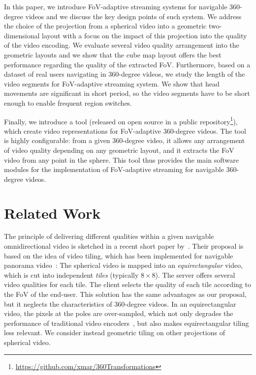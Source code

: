 In this paper, we introduce \ac{FoV}-adaptive streaming systems for navigable 360-degree
videos and we discuss the key design points of such system. We address
the choice of the projection from a spherical video into a geometric two-dimensional layout
with a focus on the impact of this projection into the quality of the video encoding. We evaluate
several video quality arrangement into the geometric layouts and we show that the 
cube map layout offers the best performance regarding the quality of the extracted 
\ac{FoV}.
Furthermore, based on a dataset of
real users navigating in 360-degree videos, we study the length of the video segments
for \ac{FoV}-adaptive streaming system. We show that head movements are significant
in short period, so the video segments have to be short enough to enable 
frequent region switches.

Finally, we introduce a tool (released on open source in a public
repository\footnote{\url{https://github.com/xmar/360Transformations}}), 
which create video representations for 
\ac{FoV}-adaptive 360-degree videos.
The tool is highly configurable: from a given 360-degree video, it allows
any arrangement of video quality depending on any geometric layout, and it
extracts the
\ac{FoV} video from any point in the sphere. This tool thus provides the
main software modules for the implementation of \ac{FoV}-adaptive streaming
for navigable 360-degree videos.


\section{Related Work}
\label{sec:relatedwork}

The principle of delivering different qualities within a given navigable 
omnidirectional video is sketched
in a recent short paper by~\citet{ochi_live_2015}. Their proposal is based on the idea of video
tiling, which has been implemented for navigable panorama
video~\cite{sanchez_compressed_2015,wang_mixing_2014,gaddam_tiling_2015}:
The spherical video is mapped into an \emph{equirectangular} video, which
is cut into independent \emph{tiles} (typically $8\times 8$). The server offers several
video qualities for each tile. The client selects the quality of each tile according to
the \ac{FoV} of the end-user. This
solution has the same advantages as our proposal, but it neglects
the characteristics of 360-degree
videos. In an equirectangular video, the pixels
at the poles are over-sampled, which not only degrades the
performance of traditional video encoders~\cite{wojciechowski_h.264_2006,yu_framework_2015}, but also
makes equirectangular tiling less relevant. We consider instead geometric tiling on
other projections of spherical video.


